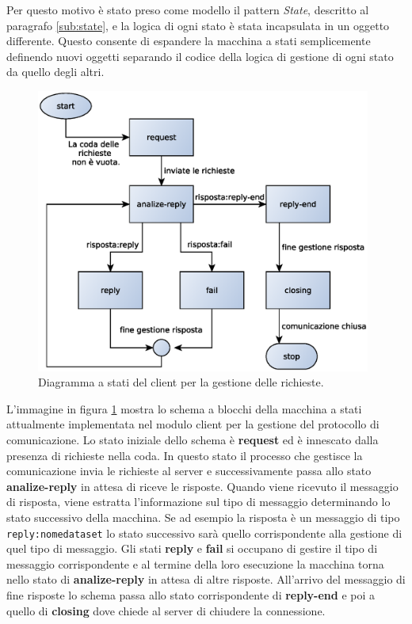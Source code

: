 Per questo motivo \`e stato preso come modello il pattern \textit{State}, descritto al paragrafo \ref{sub:state}, e la logica di ogni stato \`e stata incapsulata in un oggetto differente. Questo consente di espandere la macchina a stati semplicemente definendo nuovi oggetti separando il codice della logica di gestione di ogni stato da quello degli altri.

\begin{figure}
\begin{center}
\includegraphics[width=11cm]{Immagini/StateMachineClient}
\caption{Diagramma a stati del client per la gestione delle richieste.\label{f:stateclient}} 
\end{center} 
\end{figure}

L'immagine in figura \ref{f:stateclient} mostra lo schema a blocchi della macchina a stati attualmente implementata nel modulo client per la gestione del protocollo di comunicazione. Lo stato iniziale dello schema \`e \textbf{request} ed \`e innescato dalla presenza di richieste nella coda. In questo stato il processo che gestisce la comunicazione invia le richieste al server e successivamente passa allo stato \textbf{analize-reply} in attesa di riceve le risposte.
Quando viene ricevuto il messaggio di risposta, viene estratta l'informazione sul tipo di messaggio determinando lo stato successivo della macchina. Se ad esempio la risposta \`e un messaggio di tipo \texttt{reply:nomedataset} lo stato successivo sar\`a quello corrispondente alla gestione di quel tipo di messaggio. Gli stati \textbf{reply} e \textbf{fail} si occupano di gestire il tipo di messaggio corrispondente e al termine della loro esecuzione la macchina torna nello stato di \textbf{analize-reply} in attesa di altre risposte.
All'arrivo del messaggio di fine risposte lo schema passa allo stato corrispondente di \textbf{reply-end} e poi a quello di \textbf{closing} dove chiede al server di chiudere la connessione. 

